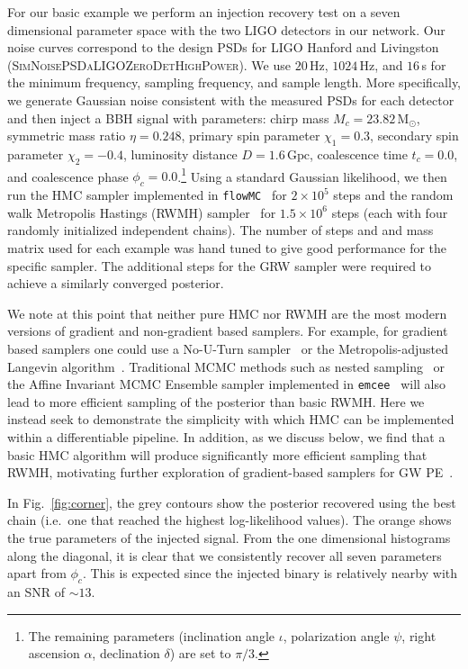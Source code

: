 \documentclass[twocolumn]{aastex631}
\newcommand{\flowMC}{\texttt{flowMC}\xspace}
\begin{document}
For our basic example we perform an injection recovery test on a seven dimensional parameter space with the two LIGO detectors in our network.
Our noise curves correspond to the design PSDs for LIGO Hanford and Livingston (\textsc{SimNoisePSDaLIGOZeroDetHighPower}).
We use $20\,$Hz, $1024\,$Hz, and $16\,$s for the minimum frequency, sampling frequency, and sample length.
More specifically, we generate Gaussian noise consistent with the measured PSDs for each detector and then inject a BBH signal with parameters: chirp mass $M_c = 23.82\,\mathrm{M_\odot}$,  symmetric mass ratio $\eta = 0.248$, primary spin parameter $\chi_1=0.3$, secondary spin parameter $\chi_2=-0.4$, luminosity distance $D = 1.6\,\mathrm{Gpc}$, coalescence time $t_c = 0.0$, and coalescence phase $\phi_c = 0.0$.\footnote{
    The remaining parameters (inclination angle $\iota$, polarization angle $\psi$, right ascension $\alpha$, declination $\delta$) are set to $\pi/3$.
}
Using a standard Gaussian likelihood, we then run the HMC sampler implemented in \flowMC~\citep{2022arXiv221106397W} for $2\times10^5$ steps and the random walk Metropolis Hastings (RWMH) sampler~\citep{1953JChPh..21.1087M} for $1.5\times10^6$ steps (each with four randomly initialized independent chains). 
The number of steps and and mass matrix used for each example was hand tuned to give good performance for the specific sampler.
The additional steps for the GRW sampler were required to achieve a similarly converged posterior.

We note at this point that neither pure HMC nor RWMH are the most modern versions of gradient and non-gradient based samplers.
For example, for gradient based samplers one could use a No-U-Turn sampler~\citep{2011arXiv1111.4246H} or the Metropolis-adjusted Langevin algorithm~\citep{2013arXiv1309.2983X}.
Traditional MCMC methods such as nested sampling~\citep{Skilling2004, multinest, dynesty} or the Affine Invariant MCMC Ensemble sampler implemented in \texttt{emcee}~\citep{2013PASP..125..306F} will also lead to more efficient sampling of the posterior than basic RWMH.
Here we instead seek to demonstrate the simplicity with which HMC can be implemented within a differentiable pipeline.
In addition, as we discuss below, we find that a basic HMC algorithm will produce significantly more efficient sampling that RWMH, motivating further exploration of gradient-based samplers for GW PE~\citep{PEpaper}.


In Fig.~\ref{fig:corner}, the grey contours show the posterior recovered using the best chain (i.e.~one that reached the highest log-likelihood values).
The orange shows the true parameters of the injected signal.
From the one dimensional histograms along the diagonal, it is clear that we consistently recover all seven parameters apart from $\phi_c$.
This is expected since the injected binary is relatively nearby with an SNR of $\sim13$.
\end{document}
